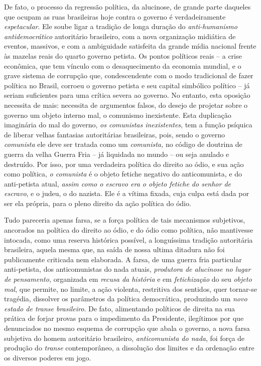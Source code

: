 De fato, o processo da regressão política, da alucinose, de grande parte
daqueles que ocupam as ruas brasileiras hoje contra o governo é
verdadeiramente \emph{espetacular}. Ele soube ligar a tradição de longa
duração do \emph{anti-humanismo antidemocrático} autoritário brasileiro,
com a nova organização midiática de eventos, massivos, e com a
ambiguidade satisfeita da grande mídia nacional frente às mazelas reais
do quarto governo petista. Os pontos políticos reais -- a crise
econômica, que tem vínculo com o desaquecimento da economia mundial, e o
grave sistema de corrupção que, condescendente com o modo tradicional de
fazer política no Brasil, corroeu o governo petista e seu capital
simbólico político -- já seriam suficientes para uma crítica severa ao
governo. No entanto, esta oposição necessita de mais: necessita de
argumentos falsos, do desejo de projetar sobre o governo um objeto
interno mal, o comunismo inexistente. Esta duplicação imaginária do mal
do governo, \emph{os comunistas inexistentes}, tem a função psíquica de
liberar velhas fantasias autoritárias brasileiras, pois, sendo o governo
\emph{comunista} ele deve ser tratada como um \emph{comunista,} no
código de doutrina de guerra da velha Guerra Fria -- já liquidada no
mundo -- ou seja anulado e destruído. Por isso, por uma verdadeira
política do direito ao ódio, e sua ação como política, \emph{o
comunista} é o objeto fetiche negativo do anticomunista, e do
anti-petista atual, \emph{assim como o escravo era o objeto fetiche do
senhor de escravo}, e o judeu, o do nazista. Ele é a vítima fixada, cuja
culpa está dada por ser ela própria, para o pleno direito da ação
política do ódio.

Tudo pareceria apenas farsa, se a força política de tais mecanismos
subjetivos, ancorados na política do direito ao ódio, e do ódio como
política, não mantivesse intocada, como uma reserva histórica possível,
a longuíssima tradição autoritária brasileira, aquela mesma que, na
saída de nossa ultima ditadura não foi publicamente criticada nem
elaborada. A farsa, de uma guerra fria particular anti-petista, dos
anticomunistas do nada atuais, \emph{produtora de alucinose no lugar de
pensamento,} organizada em \emph{recusa da história} e em
\emph{fetichização} do seu \emph{objeto mal}, que permite, no limite, a
ação violenta, restritiva dos sentidos, quer tornar-se tragédia,
dissolver os parâmetros da política democrática, produzindo um
\emph{novo estado de transe brasileiro}. De fato, alimentando políticos
de direita na sua prática de forjar provas para o impedimento da
Presidente, ilegítimos por que denunciados no mesmo esquema de corrupção
que abala o governo, a nova farsa subjetiva do homem autoritário
brasileiro, \emph{anticomunista do nada}, foi força de produção do
\emph{transe} contemporâneo, a dissolução dos limites e da ordenação
entre os diversos poderes em jogo.

